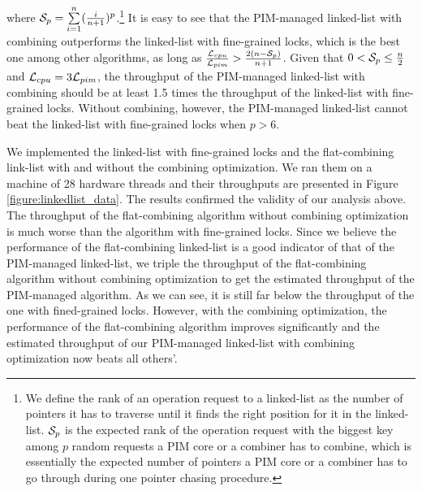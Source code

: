 where $\mathcal{S}_{p} = \sum\limits_{i=1}^{n} ({i \over n+1})^{p}$.\footnote{
We define the rank of an operation request to a linked-list as the number of pointers
it has to traverse until it finds the right position for it in the linked-list.
$\mathcal{S}_{p}$ is the expected rank of the operation request with the biggest key
among $p$ random requests a PIM core or a combiner has to combine,
which is essentially the expected number of pointers a PIM core or a combiner
has to go through during one pointer chasing procedure.} 
It is easy to see that the PIM-managed linked-list with combining outperforms 
the linked-list with fine-grained locks, which is the best one among other algorithms, 
as long as ${\mathcal{L}_{cpu} \over \mathcal{L}_{pim}} > {2(n - \mathcal{S}_{p})\over n + 1}$.
Given that $0 < \mathcal{S}_{p} \le {n \over 2}$ and $\mathcal{L}_{cpu} = 3\mathcal{L}_{pim}$,
the throughput of the PIM-managed linked-list with combining should be at least 
1.5 times the throughput of the linked-list with fine-grained locks.
Without combining, however, the PIM-managed linked-list cannot
beat the linked-list with fine-grained locks when $p > 6$.

We implemented the linked-list with fine-grained locks
and the flat-combining link-list with and without the combining optimization.
We ran them on a machine of 28 hardware threads
and their throughputs are presented in Figure \ref{figure:linkedlist_data}.
The results confirmed the validity of our analysis above.
The throughput of the flat-combining algorithm without combining optimization
is much worse than the algorithm with fine-grained locks.
Since we believe the performance of the flat-combining linked-list is a good 
indicator of that of the PIM-managed linked-list, we triple the throughput of the
flat-combining algorithm without combining optimization to get the estimated
throughput of the PIM-managed algorithm. 
As we can see, it is still far below the throughput of the one with fined-grained locks.
However, with the combining optimization, the performance of the flat-combining
algorithm improves significantly and the estimated throughput of our PIM-managed
linked-list with combining optimization now beats all others'.



